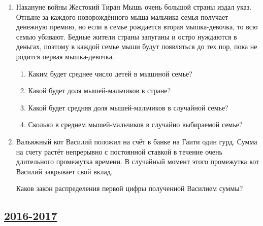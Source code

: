 \begin{enumerate}
\item Накануне войны Жестокий Тиран Мышь очень большой страны издал указ.
Отныне за каждого новорождённого мыша-мальчика семья получает денежную премию,
но если в семье рождается вторая мышка-девочка, то всю семью убивают.
Бедные жители страны запуганы и остро нуждаются в деньгах, поэтому в каждой семье
мыши будут появляться до тех пор, пока не родится первая мышка-девочка.
\begin{enumerate}
  \item Каким будет среднее число детей в мышиной семье?
  \item Какой будет доля мышей-мальчиков в стране?
  \item Какой будет средняя доля мышей-мальчиков в случайной семье?
  \item Сколько в среднем мышей-мальчиков в случайно выбираемой семье?
\end{enumerate}

\item Вальяжный кот Василий положил на счёт в банке на Гаити один гурд.
Сумма на счету растёт непрерывно с постоянной ставкой в течение очень длительного
промежутка времени. В случайный момент этого промежутка кот Василий закрывает свой вклад.

Каков закон распределения первой цифры полученной Василием суммы?
\end{enumerate}



\newpage
\subsection[2016-2017]{\hyperref[sec:sol_kr_01_ip_2016_2017]{2016-2017}}
\label{sec:kr_01_ip_2016_2017}


